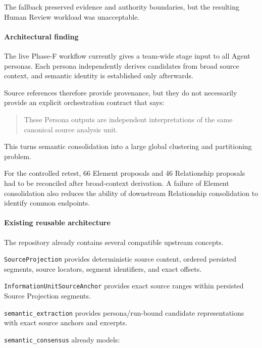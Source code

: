 The fallback preserved evidence and authority boundaries, but the resulting Human Review workload was unacceptable.

\hypertarget{architectural-finding}{%
\paragraph{Architectural finding}\label{architectural-finding}}

The live Phase-F workflow currently gives a team-wide stage input to all Agent personas. Each persona independently derives candidates from broad source context, and semantic identity is established only afterwards.

Source references therefore provide provenance, but they do not necessarily provide an explicit orchestration contract that says:

\begin{quote}
These Persona outputs are independent interpretations of the same canonical source analysis unit.
\end{quote}

This turns semantic consolidation into a large global clustering and partitioning problem.

For the controlled retest, 66 Element proposals and 46 Relationship proposals had to be reconciled after broad-context derivation. A failure of Element consolidation also reduces the ability of downstream Relationship consolidation to identify common endpoints.

\hypertarget{existing-reusable-architecture}{%
\paragraph{Existing reusable architecture}\label{existing-reusable-architecture}}

The repository already contains several compatible upstream concepts.

\texttt{SourceProjection} provides deterministic source content, ordered persisted segments, source locators, segment identifiers, and exact offsets.

\texttt{InformationUnitSourceAnchor} provides exact source ranges within persisted Source Projection segments.

\texttt{semantic\_extraction} provides persona/run-bound candidate representations with exact source anchors and excerpts.

\texttt{semantic\_consensus} already models:

